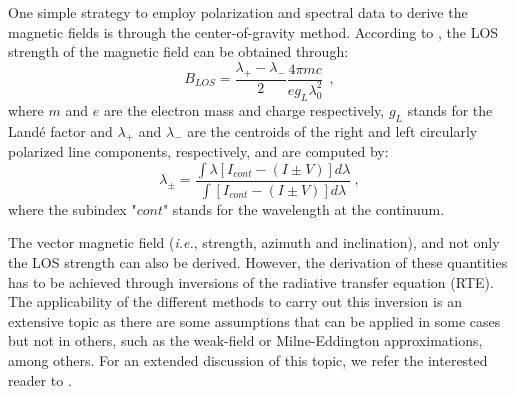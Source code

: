 One simple strategy to employ polarization and spectral data to derive the magnetic fields is through the center-of-gravity method. According to \cite{center_of_gravity}, the LOS strength of the magnetic field can be obtained through:
\begin{equation}
  B_{LOS} = \frac{\lambda _ {+} - \lambda _ -}{2}\frac{4\pi m c}{eg_{L}\lambda_0 ^2}\ \ ,
  \label{eq_spectro: Blos-cog}
\end{equation}  
where $m$ and $e$ are the electron mass and charge respectively, $g_L$ stands for the Landé factor and $\lambda _ {+}$ and $\lambda _ {-}$ are the centroids of the right and left circularly polarized line components, respectively, and are computed by:
\begin{equation}
  \lambda _ {\pm} = \frac{\int \lambda \left[I_{cont} - (I \pm V)\right]d\lambda}{\int \left[I_{cont} - (I \pm V)\right]d\lambda} \ ,
  \label{eq_spectro: lambda_plus_minus}
\end{equation} 
where the subindex "$cont$" stands for the wavelength at the continuum. 

The vector magnetic field (\textit{i.e.}, strength, azimuth and inclination), and not only the LOS strength can also be derived. However, the derivation of these quantities has to be achieved through inversions of the radiative transfer equation (RTE). The applicability of the different methods to carry out this inversion is an extensive topic as there are some assumptions that can be applied in some cases but not in others, such as the weak-field or Milne-Eddington approximations, among others. For an extended discussion of this topic, we refer the interested reader to \cite{del2016inversion}.   
